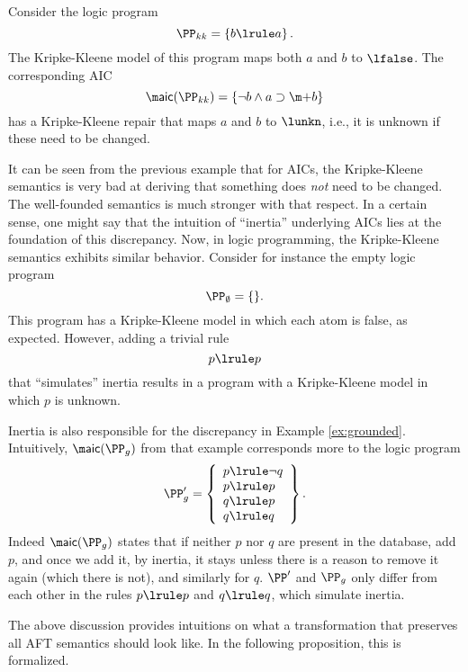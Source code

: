 


\begin{example}
 Consider the logic program
 \[\PP_{kk}=\left\{ b\lrule a\right\}.\]
 The Kripke-Kleene model of this program maps both $a$ and $b$ to $\lfalse$. 
 The corresponding AIC 
 \[\aicop(\PP_{kk}) = \{\lnot b \land a \aicrule \add b\}\] 
 has a Kripke-Kleene repair that maps $a$ and $b$ to $\lunkn$, i.e., it is unknown if these need to be changed. 
\end{example}


It can be seen from the previous example that for AICs, the Kripke-Kleene semantics is very bad at deriving that something does \emph{not} need to be changed. The well-founded semantics is much stronger with that respect. 
In a certain sense, one might say that the intuition of ``inertia'' underlying AICs lies at the foundation of this discrepancy. 
Now, in logic programming, the Kripke-Kleene semantics exhibits similar behavior. Consider for instance the empty logic program 
\[ \PP_\emptyset = \{ \}.\]
This program has a Kripke-Kleene model in which each atom is false, as expected. 
However, adding a trivial rule
\[p\lrule p\]
 that ``simulates'' inertia results in a program with a Kripke-Kleene model in which $p$ is unknown.
 
 Inertia is also responsible for the discrepancy in Example \ref{ex:grounded}. 
 Intuitively, $\aicop(\PP_g)$ from that example corresponds more to the logic program
  \[\PP_g' = \left\{\begin{array}{l}p\lrule \lnot q \\ p\lrule p \\ q\lrule p\\ q\lrule q  \end{array}\right\}.\]
  Indeed $\aicop(\PP_g)$ states that if neither  $p$ nor $q$ are present in the database, add $p$, and once we add it, by inertia, it stays unless there is a reason to remove it again (which there is not), and similarly for $q$. 
  $\PP'$ and $\PP_g$ only differ from each other in the rules $p\lrule p$ and $q\lrule q$, which simulate inertia.
 
 
 The above discussion provides intuitions on what a transformation that preserves all AFT semantics should look like. In the following proposition, this is formalized. 

